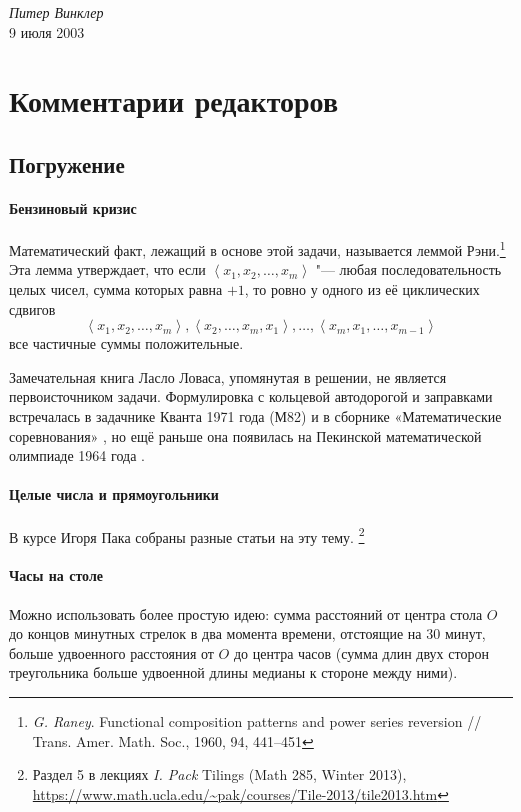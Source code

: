 \documentclass[twoside]{book}
\begin{document}
\begin{flushright}
\emph{Питер Винклер}
\\
9 июля 2003
\end{flushright}

\appendix

\chapter{Комментарии редакторов}

\section{Погружение}

\subsubsection*{Бензиновый кризис} %
Математический факт, лежащий в основе этой задачи, называется леммой Рэни.\footnote{\emph{G. Raney}. Functional composition patterns and power series reversion /\!/ Trans. Amer. Math. Soc., 1960, 94, 441--451}
Эта лемма утверждает, что если 
$\left<x_1, x_2,\ldots, x_m\right>$ "--- любая последовательность целых чисел, сумма 
которых равна $+1$, то ровно у одного из её циклических сдвигов 
$$\left<x_1, x_2,\ldots , x_m\right>, \left<x_2, \ldots, x_m, x_1\right>, \ldots, \left<x_m, x_1, \ldots, x_{m-1}\right>$$
все частичные суммы  положительные. 

Замечательная книга Ласло Ловаса, упомянутая в решении, не является первоисточником задачи.
Формулировка с кольцевой автодорогой и заправками встречалась в задачнике Кванта 1971 года (М82)
и в сборнике «Математические соревнования» \cite[задачи 76 и 77]{матсоревнования}, но ещё раньше она появилась на Пекинской математической олимпиаде 1964 года \cite[№26.6]{зарубежные}.


\subsubsection*{Целые числа и прямоугольники} %
В курсе Игоря Пака собраны разные статьи на эту тему.%
\footnote{Раздел 5 в лекциях \emph{I. Pack} Tilings (Math 285, Winter 2013), \url{https://www.math.ucla.edu/~pak/courses/Tile-2013/tile2013.htm}}

\subsubsection*{Часы на столе} %
Можно использовать более простую идею: сумма расстояний от центра стола $O$ до концов минутных стрелок в два момента времени, отстоящие на 30 минут, больше удвоенного расстояния от $O$ до центра часов (сумма длин двух сторон треугольника больше удвоенной длины медианы к стороне между ними).
\end{document}
